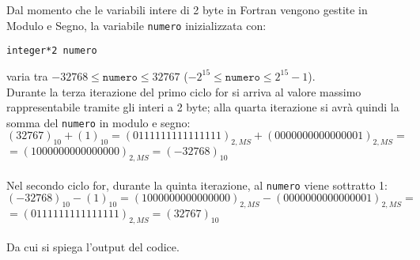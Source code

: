 Dal momento che le variabili intere di 2 byte in Fortran vengono gestite in Modulo e Segno, la variabile \texttt{numero} inizializzata con:
\begin{verbatim}
integer*2 numero
\end{verbatim}
varia tra \( -32768 \leq \texttt{numero} \leq 32767 \) (\( - 2^{15} \leq \texttt{numero} \leq 2^{15} - 1 \)). \\ 
Durante la terza iterazione del primo ciclo for si arriva al valore massimo rappresentabile tramite gli interi a 2 byte; alla quarta iterazione si avrà quindi la somma del \texttt{numero} in modulo e segno:
\[
(32767)_{10}+(1)_{10} = (0111111111111111)_{2,MS} + (0000000000000001)_{2,MS} = 
\] \( 
= (1000000000000000)_{2,MS} = (-32768)_{10} 
\) \\ \\
Nel secondo ciclo for, durante la quinta iterazione, al \texttt{numero} viene sottratto 1:
\[
(-32768)_{10}-(1)_{10} = (1000000000000000)_{2,MS} - (0000000000000001)_{2,MS} = 
\] \( 
= (0111111111111111)_{2,MS} = (32767)_{10} 
\) \\ \\
Da cui si spiega l'output del codice.